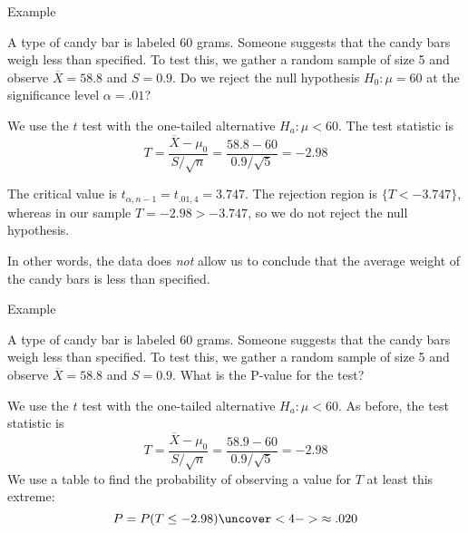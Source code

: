 \documentclass[t,handout]{beamer}
\begin{document}
\begin{frame}{Example}
    \begin{block}{}
        A type of candy bar is labeled 60 grams. Someone suggests that the candy bars weigh less than specified. To test this, we gather a random sample of size 5 and observe $\overline X=58.8$ and $S=0.9$. Do we reject the null hypothesis $H_0: \mu=60$ at the significance level $\alpha=.01$?
    \end{block}

    \pause We use the $t$ test with the one-tailed alternative $H_a: \mu<60$. The test statistic  is
    $$T=\frac{\overline X-\mu_0}{S/\sqrt{n}}=\frac{58.8-60}{0.9/\sqrt{5}}=-2.98$$

    \vspace{.2cm}
    \pause The critical value is $t_{\alpha,n-1}=t_{.01,4}=3.747$. The rejection region is $\{T < -3.747\}$, whereas in our sample $T=-2.98>-3.747$, so we do not reject the null hypothesis.

    \vspace{.2cm}
    \pause In other words, the data does \textit{not} allow us to conclude that the average weight of the candy bars is less than specified.
\end{frame}
\begin{frame}{Example}
    \begin{block}{}
        A type of candy bar is labeled 60 grams. Someone suggests that the candy bars weigh less than specified. To test this, we gather a random sample of size 5 and observe $\overline X=58.8$ and $S=0.9$. What is the P-value for the test?
    \end{block}

    \pause We use the $t$ test with the one-tailed alternative $H_a: \mu<60$. As before, the test statistic  is
    $$T=\frac{\overline X-\mu_0}{S/\sqrt{n}}=\frac{58.9-60}{0.9/\sqrt{5}}=-2.98$$
    \pause We use a table to find the probability of observing a value for $T$ at least this extreme:
    $$P=P(T\leq -2.98)
        \uncover<4->{ \approx .020 }$$
\end{frame}
\end{document}
